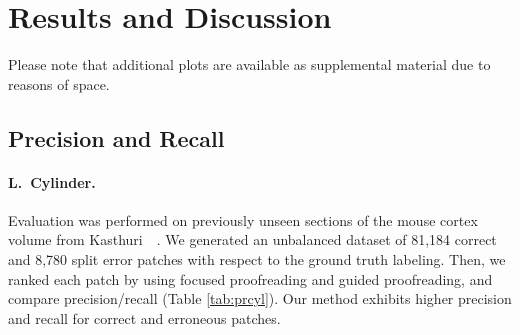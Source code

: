 \section{Results and Discussion}

Please note that additional plots are available as supplemental material due to reasons of space. 

\subsection{Precision and Recall}

\paragraph{L.~Cylinder.} Evaluation was performed on previously unseen sections of the mouse cortex volume from Kasthuri~\etal~\cite{kasthuri2015saturated}. We generated an unbalanced dataset of 81,184 correct and 8,780 split error patches with respect to the ground truth labeling. Then, we ranked each patch by using focused proofreading and guided proofreading, and compare precision/recall (Table \ref{tab:prcyl}). Our method exhibits higher precision and recall for correct and erroneous patches.

\begin{table}[t]
\caption{Classifier comparison on an unbalanced test set of the L.~Cylinder volume.}%
\label{tab:prcyl}
\end{table}

